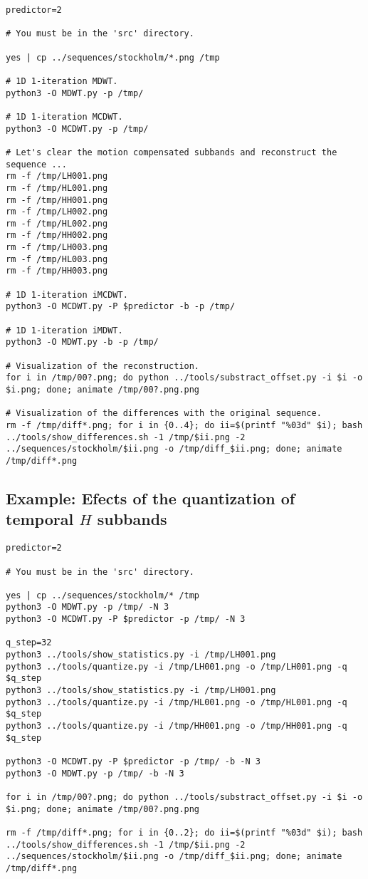 \begin{verbatim}
predictor=2

# You must be in the 'src' directory.

yes | cp ../sequences/stockholm/*.png /tmp

# 1D 1-iteration MDWT.
python3 -O MDWT.py -p /tmp/

# 1D 1-iteration MCDWT.
python3 -O MCDWT.py -p /tmp/

# Let's clear the motion compensated subbands and reconstruct the sequence ...
rm -f /tmp/LH001.png
rm -f /tmp/HL001.png
rm -f /tmp/HH001.png
rm -f /tmp/LH002.png
rm -f /tmp/HL002.png
rm -f /tmp/HH002.png
rm -f /tmp/LH003.png
rm -f /tmp/HL003.png
rm -f /tmp/HH003.png

# 1D 1-iteration iMCDWT.
python3 -O MCDWT.py -P $predictor -b -p /tmp/

# 1D 1-iteration iMDWT.
python3 -O MDWT.py -b -p /tmp/

# Visualization of the reconstruction.
for i in /tmp/00?.png; do python ../tools/substract_offset.py -i $i -o $i.png; done; animate /tmp/00?.png.png

# Visualization of the differences with the original sequence.
rm -f /tmp/diff*.png; for i in {0..4}; do ii=$(printf "%03d" $i); bash ../tools/show_differences.sh -1 /tmp/$ii.png -2 ../sequences/stockholm/$ii.png -o /tmp/diff_$ii.png; done; animate /tmp/diff*.png
\end{verbatim}


\subsection*{Example: Efects of the quantization of temporal $H$ subbands}
\begin{verbatim}
predictor=2

# You must be in the 'src' directory.

yes | cp ../sequences/stockholm/* /tmp
python3 -O MDWT.py -p /tmp/ -N 3
python3 -O MCDWT.py -P $predictor -p /tmp/ -N 3

q_step=32
python3 ../tools/show_statistics.py -i /tmp/LH001.png
python3 ../tools/quantize.py -i /tmp/LH001.png -o /tmp/LH001.png -q $q_step
python3 ../tools/show_statistics.py -i /tmp/LH001.png
python3 ../tools/quantize.py -i /tmp/HL001.png -o /tmp/HL001.png -q $q_step
python3 ../tools/quantize.py -i /tmp/HH001.png -o /tmp/HH001.png -q $q_step

python3 -O MCDWT.py -P $predictor -p /tmp/ -b -N 3
python3 -O MDWT.py -p /tmp/ -b -N 3

for i in /tmp/00?.png; do python ../tools/substract_offset.py -i $i -o $i.png; done; animate /tmp/00?.png.png

rm -f /tmp/diff*.png; for i in {0..2}; do ii=$(printf "%03d" $i); bash ../tools/show_differences.sh -1 /tmp/$ii.png -2 ../sequences/stockholm/$ii.png -o /tmp/diff_$ii.png; done; animate /tmp/diff*.png
\end{verbatim}

